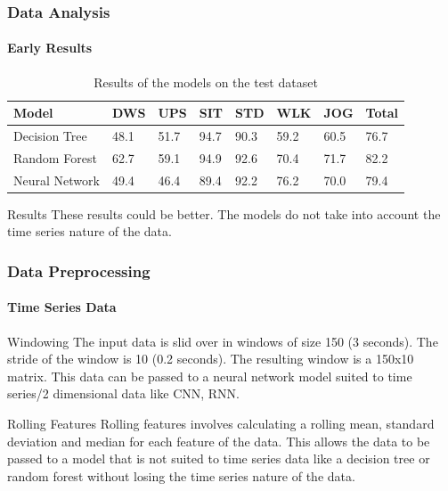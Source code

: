 \documentclass[
	11pt, %
]{beamer}
\begin{document}
\begin{frame}
    \frametitle{Data Analysis}
    \framesubtitle{Early Results}
    
	\begin{table}
		\begin{tabular}{l l l l l l l l}
			\toprule
			\textbf{Model} & \textbf{DWS} & \textbf{UPS} & \textbf{SIT} & \textbf{STD} & \textbf{WLK} & \textbf{JOG} & Total \\
			\midrule
			Decision Tree & 48.1 & 51.7 & 94.7 & 90.3 & 59.2 & 60.5 & 76.7 \\
            Random Forest & 62.7 & 59.1 & 94.9 & 92.6 & 70.4 & 71.7 & 82.2 \\
            Neural Network & 49.4 & 46.4 & 89.4 & 92.2 & 76.2 & 70.0 & 79.4 \\
			\bottomrule
		\end{tabular}
		\caption{Results of the models on the test dataset}
	\end{table}

    \begin{block}{Results}
        These results could be better. The models do not take into account the time series nature of the data.
    \end{block}
    
\end{frame}



\begin{frame}
    \frametitle{Data Preprocessing}
    \framesubtitle{Time Series Data}

    \begin{block}{Windowing}
        The input data is slid over in windows of size 150 (3 seconds). The stride of the window is 10 (0.2 seconds). The resulting window is a 150x10 matrix. This data can be passed to a neural network model suited to time series/2 dimensional data like CNN, RNN.
    \end{block}

    \begin{block}{Rolling Features}
        Rolling features involves calculating a rolling mean, standard deviation and median for each feature of the data. This allows the data to be passed to a model that is not suited to time series data like a decision tree or random forest without losing the time series nature of the data.
    \end{block}
\end{frame}
\end{document}
